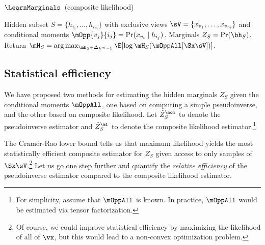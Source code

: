 \begin{algorithm}
  \caption{$\LearnMarginals$~(composite likelihood)}
  \label{algo:piecewise}
  \begin{algorithmic}
    \REQUIRE Hidden subset $S = \{ h_{i_1}, \dots, h_{i_m} \}$ with exclusive views $\sV = \{ x_{v_1}, \dots, x_{v_m} \}$
    and conditional moments $\mOpp{v_j}{i_j} = \Pr(x_{v_i} \mid h_{i_j})$.
    \ENSURE Marginals $Z_S = \Pr(\bh_S)$.
    \STATE Return $\mH_S = \arg\max_{\mH_S \in \Delta_{k^m-1}} \E[\log \mH_S(\mOppAll[\Sx \sV])]$.
  \end{algorithmic}
\end{algorithm}

\subsection{Statistical efficiency}

We have proposed two methods for estimating the hidden marginals $Z_S$ given
the conditional moments $\mOppAll$, one based on computing a simple pseudoinverse,
and the other based on composite likelihood.
Let $\hat Z^\mom_S$ to denote the pseudoinverse estimator and $\hat
  Z^\ml_S$ to denote the composite likelihood estimator.\footnote{For simplicity, assume that $\mOppAll$ is known.
  In practice, $\mOppAll$ would be estimated via tensor factorization.}

The Cram\'{e}r-Rao lower bound tells us that maximum likelihood yields the
  most statistically efficient composite estimator for $Z_S$ given
  access to only samples of $\Sx\sV$.\footnote{Of course, we could improve
  statistical efficiency by maximizing the likelihood of all of $\vx$, but
  this would lead to a non-convex optimization problem.}
Let us go one step further and quantify the \emph{relative efficiency} of the pseudoinverse
  estimator compared to the composite likelihood estimator.


